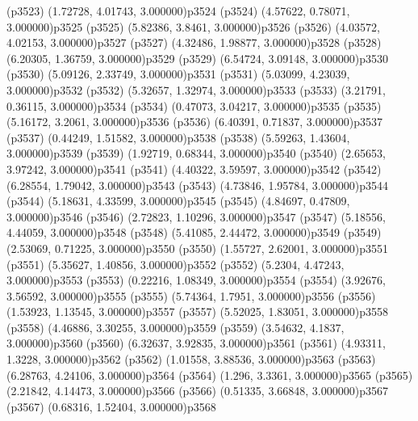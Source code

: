 \psdot(p3523)
\psPoint(1.72728, 4.01743, 3.000000){p3524}
\psdot(p3524)
\psPoint(4.57622, 0.78071, 3.000000){p3525}
\psdot(p3525)
\psPoint(5.82386, 3.8461, 3.000000){p3526}
\psdot(p3526)
\psPoint(4.03572, 4.02153, 3.000000){p3527}
\psdot(p3527)
\psPoint(4.32486, 1.98877, 3.000000){p3528}
\psdot(p3528)
\psPoint(6.20305, 1.36759, 3.000000){p3529}
\psdot(p3529)
\psPoint(6.54724, 3.09148, 3.000000){p3530}
\psdot(p3530)
\psPoint(5.09126, 2.33749, 3.000000){p3531}
\psdot(p3531)
\psPoint(5.03099, 4.23039, 3.000000){p3532}
\psdot(p3532)
\psPoint(5.32657, 1.32974, 3.000000){p3533}
\psdot(p3533)
\psPoint(3.21791, 0.36115, 3.000000){p3534}
\psdot(p3534)
\psPoint(0.47073, 3.04217, 3.000000){p3535}
\psdot(p3535)
\psPoint(5.16172, 3.2061, 3.000000){p3536}
\psdot(p3536)
\psPoint(6.40391, 0.71837, 3.000000){p3537}
\psdot(p3537)
\psPoint(0.44249, 1.51582, 3.000000){p3538}
\psdot(p3538)
\psPoint(5.59263, 1.43604, 3.000000){p3539}
\psdot(p3539)
\psPoint(1.92719, 0.68344, 3.000000){p3540}
\psdot(p3540)
\psPoint(2.65653, 3.97242, 3.000000){p3541}
\psdot(p3541)
\psPoint(4.40322, 3.59597, 3.000000){p3542}
\psdot(p3542)
\psPoint(6.28554, 1.79042, 3.000000){p3543}
\psdot(p3543)
\psPoint(4.73846, 1.95784, 3.000000){p3544}
\psdot(p3544)
\psPoint(5.18631, 4.33599, 3.000000){p3545}
\psdot(p3545)
\psPoint(4.84697, 0.47809, 3.000000){p3546}
\psdot(p3546)
\psPoint(2.72823, 1.10296, 3.000000){p3547}
\psdot(p3547)
\psPoint(5.18556, 4.44059, 3.000000){p3548}
\psdot(p3548)
\psPoint(5.41085, 2.44472, 3.000000){p3549}
\psdot(p3549)
\psPoint(2.53069, 0.71225, 3.000000){p3550}
\psdot(p3550)
\psPoint(1.55727, 2.62001, 3.000000){p3551}
\psdot(p3551)
\psPoint(5.35627, 1.40856, 3.000000){p3552}
\psdot(p3552)
\psPoint(5.2304, 4.47243, 3.000000){p3553}
\psdot(p3553)
\psPoint(0.22216, 1.08349, 3.000000){p3554}
\psdot(p3554)
\psPoint(3.92676, 3.56592, 3.000000){p3555}
\psdot(p3555)
\psPoint(5.74364, 1.7951, 3.000000){p3556}
\psdot(p3556)
\psPoint(1.53923, 1.13545, 3.000000){p3557}
\psdot(p3557)
\psPoint(5.52025, 1.83051, 3.000000){p3558}
\psdot(p3558)
\psPoint(4.46886, 3.30255, 3.000000){p3559}
\psdot(p3559)
\psPoint(3.54632, 4.1837, 3.000000){p3560}
\psdot(p3560)
\psPoint(6.32637, 3.92835, 3.000000){p3561}
\psdot(p3561)
\psPoint(4.93311, 1.3228, 3.000000){p3562}
\psdot(p3562)
\psPoint(1.01558, 3.88536, 3.000000){p3563}
\psdot(p3563)
\psPoint(6.28763, 4.24106, 3.000000){p3564}
\psdot(p3564)
\psPoint(1.296, 3.3361, 3.000000){p3565}
\psdot(p3565)
\psPoint(2.21842, 4.14473, 3.000000){p3566}
\psdot(p3566)
\psPoint(0.51335, 3.66848, 3.000000){p3567}
\psdot(p3567)
\psPoint(0.68316, 1.52404, 3.000000){p3568}
